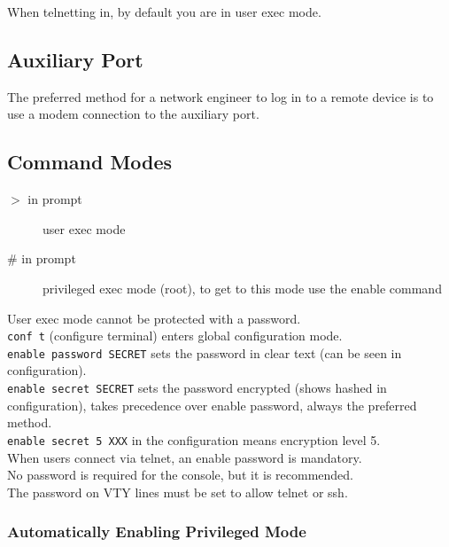 When telnetting in, by default you are in user exec mode.

\subsection{Auxiliary Port}

The preferred method for a network engineer to log in to a remote device is
to use a modem connection to the auxiliary port.

\subsection{Command Modes}

\begin{description}

\item[$>$ in prompt]
user exec mode

\item[\# in prompt]
privileged exec mode (root), to get to this mode use the enable command

\end{description}

User exec mode cannot be protected with a password.\\

\texttt{conf t} (configure terminal) enters global configuration mode.\\

\texttt{enable password SECRET} sets the password in clear text (can be seen
in configuration).\\

\texttt{enable secret SECRET} sets the password encrypted (shows hashed in
configuration), takes precedence over enable password, always the preferred
method.\\

\texttt{enable secret 5 XXX} in the configuration means encryption level 5.\\

When users connect via telnet, an enable password is mandatory.\\

No password is required for the console, but it is recommended.\\

The password on VTY lines must be set to allow telnet or ssh.

\subsubsection{Automatically Enabling Privileged Mode}

